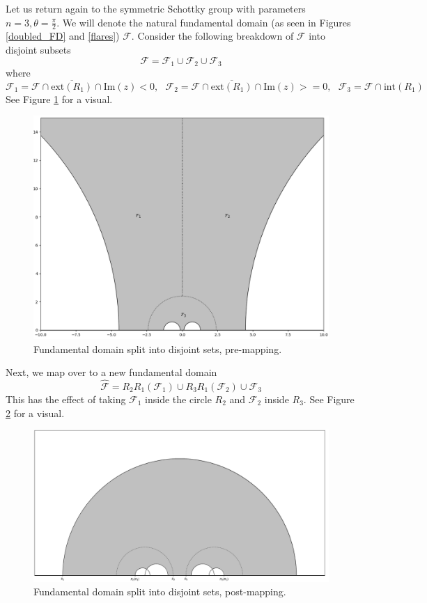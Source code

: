\documentclass[]{article}
\begin{document}
Let us return again to the symmetric Schottky group with parameters $n = 3, \theta = \frac{\pi}{2}$.
We will denote the natural fundamental domain (as seen in Figures \ref{doubled_FD} and \ref{flares}) $\mathcal{F}$.
Consider the following breakdown of $\mathcal{F}$ into disjoint subsets
$$
\mathcal{F} = \mathcal{F}_1 \cup \mathcal{F}_2 \cup \mathcal{F}_3
$$
where
$$
\mathcal{F}_1 = \mathcal{F} \cap \overline{\text{ext}(R_1)} \cap \text{Im}(z) < 0, ~~~
\mathcal{F}_2 = \mathcal{F} \cap \overline{\text{ext}(R_1)} \cap \text{Im}(z) >= 0, ~~~
\mathcal{F}_3 = \mathcal{F} \cap \text{int}(R_1)
$$
See Figure \ref{disjoint_FD} for a visual.
\begin{figure}[h]
	\centering
	\includegraphics[width=\linewidth]{disjoint_FD.png}
	\caption{Fundamental domain split into disjoint sets, pre-mapping.}
	\label{disjoint_FD}
\end{figure}

Next, we map over to a new fundamental domain
$$
\hat{\mathcal{F}} = R_2R_1(\mathcal{F}_1) \cup R_3R_1(\mathcal{F}_2) \cup \mathcal{F}_3
$$
This has the effect of taking $\mathcal{F}_1$ inside the circle $R_2$ and $\mathcal{F}_2$ inside $R_3$.
See Figure \ref{shifted_FD} for a visual.
\begin{figure}[h]
	\centering
	\includegraphics[width=0.9\linewidth]{shifted_FD.png}
	\caption{Fundamental domain split into disjoint sets, post-mapping.}
	\label{shifted_FD}
\end{figure}
\end{document}
